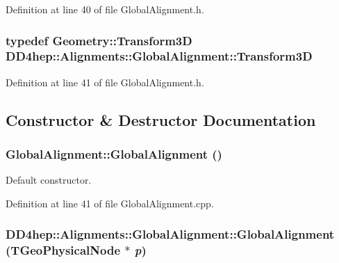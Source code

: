 Definition at line 40 of file GlobalAlignment.h.\hypertarget{class_d_d4hep_1_1_alignments_1_1_global_alignment_a328240cbc53ba92424336a5898ba49d3}{
\subsubsection[{Transform3D}]{\setlength{\rightskip}{0pt plus 5cm}typedef {\bf Geometry::Transform3D} {\bf DD4hep::Alignments::GlobalAlignment::Transform3D}}}
\label{class_d_d4hep_1_1_alignments_1_1_global_alignment_a328240cbc53ba92424336a5898ba49d3}


Definition at line 41 of file GlobalAlignment.h.

\subsection{Constructor \& Destructor Documentation}
\hypertarget{class_d_d4hep_1_1_alignments_1_1_global_alignment_a022dd4bb7b30b90de999a8d9ed3e7d4a}{
\subsubsection[{GlobalAlignment}]{\setlength{\rightskip}{0pt plus 5cm}GlobalAlignment::GlobalAlignment ()}}
\label{class_d_d4hep_1_1_alignments_1_1_global_alignment_a022dd4bb7b30b90de999a8d9ed3e7d4a}


Default constructor. 

Definition at line 41 of file GlobalAlignment.cpp.\hypertarget{class_d_d4hep_1_1_alignments_1_1_global_alignment_a49f7dd112c9adddc872156f145ccaf78}{
\subsubsection[{GlobalAlignment}]{\setlength{\rightskip}{0pt plus 5cm}DD4hep::Alignments::GlobalAlignment::GlobalAlignment (TGeoPhysicalNode $\ast$ {\em p})}}
\label{class_d_d4hep_1_1_alignments_1_1_global_alignment_a49f7dd112c9adddc872156f145ccaf78}


